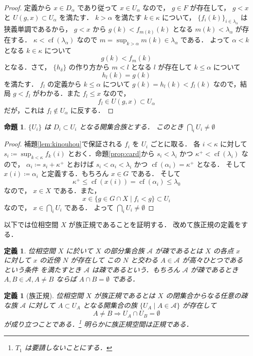 \documentclass[leqno, 12pt]{ltjsarticle}
\newtheorem{prop}[thm]{命題}
\newtheorem{df}[thm]{定義}
\newcommand{\To}{\Longrightarrow}
\newcommand{\basicopen}[2]{U(#1,#2)}
\newcommand{\kappasucc}{\kappa^{+}}
\DeclareMathOperator{\cf}{cf}
\begin{document}
\begin{proof}
定義から
$x\in D_{\alpha}$
であり従って
$x\in U_{\alpha}$
なので，
$g\in F$
が存在して，
$g<x$
と
$\basicopen{g}{x}\subset U_{\alpha}$
を満たす．
$k>\alpha$
を満たす
$k\in \kappa$
について，
$\{f_{i}(k)\}_{i\in \lambda_{\alpha}}$
は狭義単調であるから，
$g<x$
から
$g(k)<f_{m(k)}(k)$
となる
$m(k)<\lambda_{\alpha}$
が存在する．
$\kappa<\cf(\lambda_{\alpha})$
なので
$m=\sup_{k>\alpha}m(k)\in \lambda_{\alpha}$
である．
よって
$\alpha<k$
となる
$k\in\kappa$
について
\[
g(k)<f_{m}(k)
\]
となる．さて，
$\{h_{\delta}\}$
の作り方から
$m<l$
となる
$l$
が存在して
$k\le \alpha$
について
\[
h_{l}(k)=g(k)
\]
を満たす．
$f_{l}$
の定義から
$k\le \alpha$
について
$g(k)=h_{l}(k)<f_{l}(k)$
なので，結局
$g<f_{l}$
がわかる．また
$f_{l}\le x$
なので，
\[
f_{l}\in \basicopen{g}{x}\subset U_{\alpha}
\]
だが，これは
$f_{l}\notin U_{\alpha}$
に反する．
\end{proof}

\begin{prop}
$\{U_{i}\}$
は
$D_{i}\subset U_{i}$
となる開集合族とする．
このとき
$\bigcap_{i}U_{i}\neq\emptyset$
\end{prop}
\begin{proof}
補題\ref{lem:kinouhou}で保証される
$f_{i}$
を
$U_{i}$
ごとに取る．
各
$i<\kappa$
に対して
$s_{i}\coloneqq\sup_{k<\kappa}f_{k}(i)$
とおく．命題\ref{prop:card}から
$s_{i}<\lambda_{i}$
かつ
$\kappasucc<\cf(\lambda_{i})$
なので，
$\alpha_{i}\coloneqq s_{i}+\kappasucc$
とおけば
$s_{i}<\alpha_{i}<\lambda_{i}$
かつ
$\cf(\alpha_{i})=\kappasucc$
となる．
そして
$x(i)\coloneqq\alpha_{i}$
と定義する．もちろん
$x\in G$
である．
そして
\[
\kappasucc\le \cf(x(i))=\cf(\alpha_{i})\le \lambda_{0}
\]
なので，
$x\in X$
である．また，
\[
x\in \{g\in G\cap X \mid f_{i}<g\}\subset U_{i}
\]
なので，
$x\in \bigcap_{i}U_{i}$
である．
よって
$\bigcap_{i}U_{i}\neq\emptyset$

\end{proof}


以下では位相空間
$X$
が族正規であることを証明する．
改めて族正規の定義をする．

\begin{df}
位相空間
$X$
に於いて
$X$
の部分集合族
$\mathcal{A}$
が疎であるとは
$X$
の各点
$x$
に対して
$x$
の近傍
$N$
が存在して
この
$N$
と交わる
$A\in\mathcal{A}$
が高々ひとつであるという条件
を満たすとき
$\mathcal{A}$
は疎であるという．もちろん
$\mathcal{A}$
が疎であるとき
$A,B\in \mathcal{A},A\neq B$
ならば
$A\cap B=\emptyset$
である．
\end{df}
\begin{df}[族正規]
位相空間
$X$
が族正規であるとは
$X$
の閉集合からなる任意の疎な族
$\mathcal{A}$
に対して
$A\subset U_{A}$
となる開集合の族
$\{U_{A} \mid A\in \mathcal{A}\}$
が存在して
\[
A\neq B\To U_{A}\cap U_{B}=\emptyset
\]
が成り立つことである．\footnote{
$T_{1}$
は要請しないことにする．}
明らかに族正規空間は正規である．
\end{df}
\end{document}
